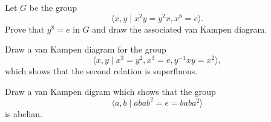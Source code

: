 \begin{questions}
\question Let $G$ be the group
  \[ \langle x,y \mid x^2y=y^2x, x^8=e \rangle. \]
  Prove that $y^8=e$ in $G$ and draw the associated van Kampen diagram.

\question Draw a van Kampen diagram for the group
  \[ \langle x,y \mid x^3=y^2, x^3=e, y^{-1}xy=x^2 \rangle, \]
  which shows that the second relation is superfluous.

\question Draw a van Kampen digram which shows that the group
  \[ \langle a,b \mid abab^2 = e = baba^2 \rangle \]
  is abelian.
\end{questions}


